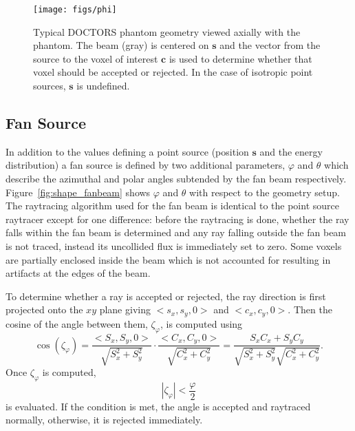 \begin{figure}[tb]
  \begin{center}
   \texttt{[image: figs/phi]}
  \end{center}
  \caption{Typical DOCTORS phantom geometry viewed axially with the phantom. The beam (gray) is centered on $\boldsymbol{s}$ and the vector from the source to the voxel of interest $\boldsymbol{c}$ is used to determine whether that voxel should be accepted or rejected. In the case of isotropic point sources, $\boldsymbol{s}$ is undefined.}
\label{fig:phi}
\end{figure}

\subsection{Fan Source}
In addition to the values defining a point source (position $\boldsymbol{s}$ and the energy distribution) a fan source is defined by two additional parameters, $\varphi$ and $\theta$ which describe the azimuthal and polar angles subtended by the fan beam respectively. Figure~\ref{fig:shape_fanbeam} shows $\varphi$ and $\theta$ with respect to the geometry setup. The raytracing algorithm used for the fan beam is identical to the point source raytracer except for one difference: before the raytracing is done, whether the ray falls within the fan beam is determined and any ray falling outside the fan beam is not traced, instead its uncollided flux is immediately set to zero. Some voxels are partially enclosed inside the beam which is not accounted for resulting in artifacts at the edges of the beam.

To determine whether a ray is accepted or rejected, the ray direction is first projected onto the $xy$ plane giving $<s_x, s_y, 0>$ and $<c_x, c_y, 0>$. Then the cosine of the angle between them, $\zeta_\varphi$, is computed using 
\begin{equation}\label{eq:phicos}
\cos(\zeta_\varphi) = \frac{<S_x, S_y, 0>}{\sqrt{S_x^2 + S_y^2}} \cdot \frac{<C_x, C_y, 0>}{\sqrt{C_x^2 + C_y^2}} = \frac{S_x C_x + S_y C_y}{\sqrt{S_x^2 + S_y^2} \sqrt{C_x^2 + C_y^2}}.
\end{equation}
Once $\zeta_\varphi$ is computed,
\begin{equation}\label{eq:phicoscon}
|\zeta_\varphi| < \frac{\varphi}{2}
\end{equation}
is evaluated. If the condition is met, the angle is accepted and raytraced normally, otherwise, it is rejected immediately.

